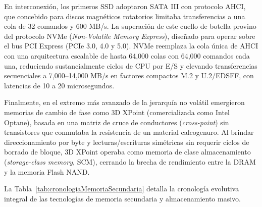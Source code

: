 \documentclass[12pt]{article}
\begin{document}
En interconexión, los primeros SSD adoptaron SATA III con protocolo AHCI, que concebido para discos magnéticos rotatorios limitaba transferencias a una cola de 32 comandos y 600 MB/s. La superación de este cuello de botella provino del protocolo NVMe (\textit{Non-Volatile Memory Express}), diseñado para operar sobre el bus PCI Express (PCIe 3.0, 4.0 y 5.0). NVMe reemplaza la cola única de AHCI con una arquitectura escalable de hasta 64,000 colas con 64,000 comandos cada una, reduciendo sustancialmente ciclos de CPU por E/S y elevando transferencias secuenciales a 7,000--14,000 MB/s en factores compactos M.2 y U.2/EDSFF, con latencias de 10 a 20 microsegundos.

Finalmente, en el extremo más avanzado de la jerarquía no volátil emergieron memorias de cambio de fase como 3D XPoint (comercializada como Intel Optane), basada en una matriz de cruce de conductores (\textit{cross-point}) sin transistores que conmutaba la resistencia de un material calcogenuro. Al brindar direccionamiento por byte y lecturas/escrituras simétricas sin requerir ciclos de borrado de bloque, 3D XPoint operaba como memoria de clase almacenamiento (\textit{storage-class memory}, SCM), cerrando la brecha de rendimiento entre la DRAM y la memoria Flash NAND.

La Tabla~\ref{tab:cronologiaMemoriaSecundaria} detalla la cronología evolutiva integral de las tecnologías de memoria secundaria y almacenamiento masivo.
\end{document}
